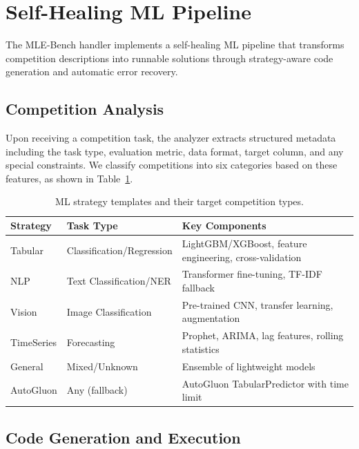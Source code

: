 \documentclass[11pt]{article}
\begin{document}
\section{Self-Healing ML Pipeline}
\label{sec:ml}

The MLE-Bench handler implements a self-healing ML pipeline that transforms competition descriptions into runnable solutions through strategy-aware code generation and automatic error recovery.

\subsection{Competition Analysis}

Upon receiving a competition task, the analyzer extracts structured metadata including the task type, evaluation metric, data format, target column, and any special constraints. We classify competitions into six categories based on these features, as shown in Table~\ref{tab:strategies}.

\begin{table}[t]
\centering
\caption{ML strategy templates and their target competition types.}
\label{tab:strategies}
\begin{tabular}{@{}llp{5.2cm}@{}}
\toprule
\textbf{Strategy} & \textbf{Task Type} & \textbf{Key Components} \\
\midrule
Tabular     & Classification/Regression & LightGBM/XGBoost, feature engineering, cross-validation \\
NLP         & Text Classification/NER   & Transformer fine-tuning, TF-IDF fallback \\
Vision      & Image Classification      & Pre-trained CNN, transfer learning, augmentation \\
TimeSeries  & Forecasting              & Prophet, ARIMA, lag features, rolling statistics \\
General     & Mixed/Unknown             & Ensemble of lightweight models \\
AutoGluon   & Any (fallback)            & AutoGluon TabularPredictor with time limit \\
\bottomrule
\end{tabular}
\end{table}

\subsection{Code Generation and Execution}
\end{document}

